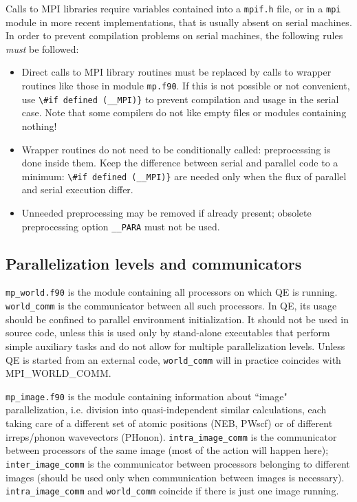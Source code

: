 \documentclass[12pt,a4paper]{article}
\begin{document}
Calls to MPI libraries require variables contained into a
\texttt{mpif.h} file, or in a \texttt{mpi} module in more
recent implementations, that is usually absent on serial machines.
In order to prevent compilation problems on serial machines,
the following rules {\em must} be followed:
\begin{itemize}
\item Direct calls to MPI library routines must be replaced by
calls to wrapper routines like those in module \texttt{mp.f90}.
If this is not possible or not convenient, use \verb|\#if defined (__MPI)}|
to prevent compilation and usage in the serial case. Note that
some compilers do not like empty files or modules containing nothing!
\item Wrapper routines do not need to be conditionally called:
preprocessing is done inside them. Keep the difference between serial
and parallel code to a minimum: \verb|\#if defined (__MPI)}| are needed
only when the flux of parallel and serial execution differ.
\item Unneeded preprocessing may be removed if already present;
obsolete preprocessing option \verb|__PARA| must not be used.
\end{itemize}

\subsection{Parallelization levels and communicators}

\texttt{mp\_world.f90} is the module containing all processors
on which QE is running. \texttt{world\_comm}
is the communicator between all such processors. In QE, its usage
should be confined to parallel environment initialization. It
should not be used in source code, unless this is used only by
stand-alone executables that perform simple auxiliary tasks
and do not allow for  multiple parallelization levels.
Unless QE is started from an external code, \texttt{world\_comm}
will in practice coincides with MPI\_WORLD\_COMM.

\texttt{mp\_image.f90} is the module containing information about
``image" parallelization, i.e. division into quasi-independent similar
calculations, each taking care of a different set of atomic
positions (NEB, PWscf) or of different irreps/phonon wavevectors
(PHonon). \texttt{intra\_image\_comm} is the communicator between
processors of the same image (most of the action will happen here);
\texttt{inter\_image\_comm} is the communicator between processors
belonging to different images (should be used only when communication
between images is necessary).
{\tt intra\_image\_comm} and {\tt world\_comm} coincide if there
is just one image running.
\end{document}
